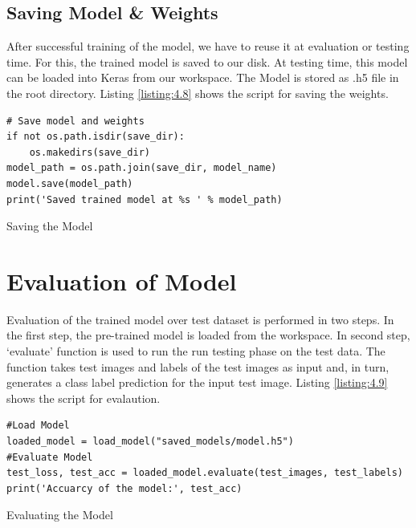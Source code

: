 \subsection{Saving Model \& Weights}
After successful training of the model, we have to reuse it
at evaluation or testing time. For this, the trained model is saved to our disk.
At testing time, this model can be loaded into Keras from our workspace. The Model is stored as .h5 file in the root directory.
Listing \ref{listing:4.8} shows the script for saving the weights.

\begin{listing}[H]
    \begin{verbatim}
# Save model and weights
if not os.path.isdir(save_dir):
    os.makedirs(save_dir)
model_path = os.path.join(save_dir, model_name)
model.save(model_path)
print('Saved trained model at %s ' % model_path)
\end{verbatim}
\caption{Saving the Model}
\label{listing:4.8}
\end{listing}
\section{Evaluation of Model}
Evaluation of  the trained model over test dataset is  performed in two steps.
In the first step, the pre-trained model is loaded from the workspace.
In second step, `evaluate' function is used to run the run testing
phase on the test data. The function takes
test images and labels of the test images as input and, in turn,
generates a class label prediction for the input  test image. Listing \ref{listing:4.9} shows the script for
evalaution.
\begin{longlisting}
    \begin{verbatim}
#Load Model
loaded_model = load_model("saved_models/model.h5")
#Evaluate Model
test_loss, test_acc = loaded_model.evaluate(test_images, test_labels)
print('Accuarcy of the model:', test_acc)
\end{verbatim}
\caption{Evaluating the Model}
\label{listing:4.9}
\end{longlisting}
